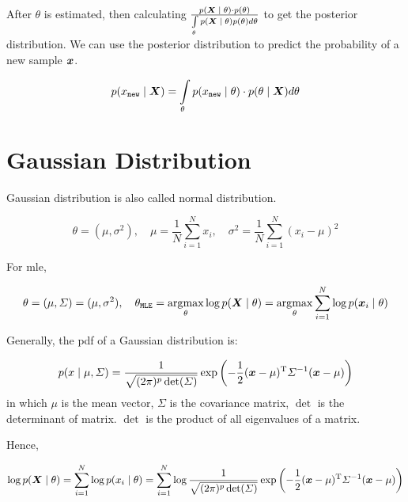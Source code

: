 After \(\theta\) is estimated, then  calculating \(\frac{p\giventhat{\vX}{\theta} \cdot p(\theta)}{\int\limits_{\theta} p\giventhat{\vX}{\theta} p(\theta) d\theta}\) to get the posterior distribution.
We can use the posterior distribution to predict the probability of a new sample \(\vx\).

\begin{equation}
	p \giventhat{x_{\mathtt{new}}}{\vX}  = \int\limits_{\theta} p\giventhat{x_{\mathtt{new}}}{\theta} \cdot p\giventhat{\theta}{\vX} d\theta
\end{equation}

\section{Gaussian Distribution}

Gaussian distribution is also called normal distribution.

\begin{equation}
	\theta = (\mu, \sigma^2), \quad \mu = \frac{1}{N} \sum_{i=1}^{N} x_i, \quad \sigma^2 = \frac{1}{N} \sum_{i=1}^{N} (x_i - \mu)^2
\end{equation}

For \gls{mle},

\begin{equation}
	\theta = (\mu, \Sigma) = (\mu, \sigma^2), \quad \theta_{\mathtt{MLE}} = \argmax_{\theta} \log p\giventhat{\vX}{\theta} = \argmax_{\theta} \sum_{i=1}^{N} \log p\giventhat{\vx_i}{\theta}
\end{equation}


Generally, the \gls{pdf} of a Gaussian distribution is:

\begin{equation}
	p\giventhat{x}{\mu, \Sigma} =  \frac{1}{\sqrt{(2\pi)^p \det(\Sigma)}} \exp\left(-\frac{1}{2} (\vx - \mu)\transp \Sigma^{-1} (\vx - \mu)\right)
\end{equation}
in which \(\mu\) is the mean vector, \(\Sigma\) is the covariance matrix, \(\det\) is the determinant of matrix.
\(\det\)  is the product of all eigenvalues of a matrix.

Hence,

\begin{equation}
	\log p\giventhat{\vX}{\theta}  = \sum_{i=1}^{N} \log p\giventhat{x_i}{\theta} = \sum_{i=1}^{N} \log \frac{1}{\sqrt{(2\pi)^p \det(\Sigma)}} \exp\left(-\frac{1}{2} (\vx - \mu)\transp \Sigma^{-1} (\vx - \mu)\right)
\end{equation}

